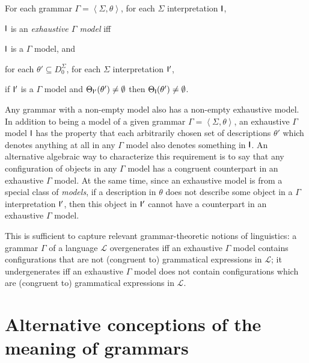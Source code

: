 \documentclass[output=paper
                ,modfonts
                ,nonflat
	        ,collection
	        ,collectionchapter
	        ,collectiontoclongg
 	        ,biblatex
                ,babelshorthands
                ,newtxmath
                ,draftmode
                ,colorlinks, citecolor=brown
]{./langsci/langscibook}
\begin{document}
{{\begin{mydef}\label{def-exhaustive-models}
For each grammar $\Gamma = \left< \Sigma, \theta \right>$,
for each $\Sigma$ interpretation $\mathsf{I}$,

$\mathsf{I}$ is an \emph{exhaustive $\Gamma$ model} iff

$\mathsf{I}$ is a $\Gamma$ model, and

for each \(\theta' \subseteq D_0^{\Sigma}\),
for each $\Sigma$ interpretation $\mathsf{I}'$,

if $\mathsf{I}'$ is a $\Gamma$ model and \(\Theta_{\mathsf{I}'}(\theta') \not= \emptyset\)
then \(\Theta_{\mathsf{I}}(\theta') \not= \emptyset\).
\end{mydef}

Any grammar with a non-empty model also has a non-empty exhaustive
model.
In addition to being a model of a given grammar $\Gamma = \left<
\Sigma, \theta \right>$, an exhaustive $\Gamma$ model $\mathsf{I}$ has the
property that each arbitrarily chosen set of descriptions $\theta'$
which denotes anything at all in any $\Gamma$ model also denotes
something in $\mathsf{I}$. An alternative algebraic way to characterize
this requirement is to say that any configuration of objects in any
$\Gamma$ model has a congruent counterpart in an exhaustive $\Gamma$
model. At the same time, since an exhaustive model is from a special class
of \emph{models}, if a description in $\theta$ does not describe some object in
a $\Gamma$ interpretation $\mathsf{I}'$, then this object in $\mathsf{I}'$ cannot
have a counterpart in an exhaustive $\Gamma$ model.

This is sufficient to capture relevant grammar-theoretic notions of
linguistics: a grammar $\Gamma$ of a language $\mathcal{L}$
overgenerates iff an exhaustive $\Gamma$ model contains configurations
that are not (congruent to) grammatical expressions in $\mathcal{L}$;
it undergenerates iff an exhaustive $\Gamma$ model does not contain
configurations which are (congruent to) grammatical expressions in
$\mathcal{L}$.




\section{Alternative conceptions of the meaning of grammars}
\label{sec-alt-gr-meaning}

}}
\end{document}
